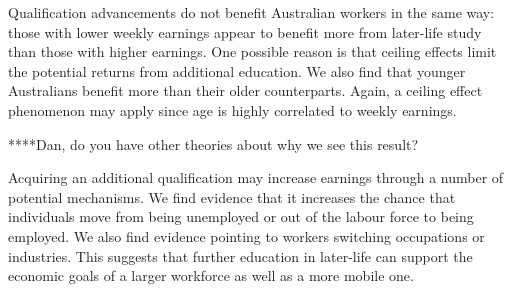 \documentclass[12pt, a4paper]{article}
\begin{document}

Qualification advancements do not benefit Australian workers in the same way: those with lower weekly earnings appear to benefit more from later-life study than those with higher earnings. One possible reason is that ceiling effects limit the potential returns from additional education. We also find that younger Australians benefit more than their older counterparts. Again, a ceiling effect phenomenon may apply since age is highly correlated to weekly earnings. 

****Dan, do you have other theories about why we see this result? 

Acquiring an additional qualification may increase earnings through a number of potential mechanisms. We find evidence that it increases the chance that individuals move from being unemployed or out of the labour force to being employed. We also find evidence pointing to workers switching occupations or industries. This suggests that further education in later-life can support the economic goals of a larger workforce as well as a more mobile one.


\end{document}
